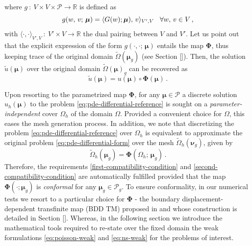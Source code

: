 \documentclass[12pt, a4paper, twoside, openright]{report}
\numberwithin{equation}{chapter}
\theoremstyle{theorem}
\theoremstyle{definition}
\theoremstyle{remark}
\theoremstyle{proposition}
\numberwithin{figure}{chapter}
\newcommand{\wt}[1]{\widetilde{#1}}
\newcommand{\bg}[1]{\boldsymbol{#1}}
\begin{document}
		where $g ~ : ~ V \times V \times \mathcal{P} \rightarrow \mathbb{R}$ is defined as
		\begin{equation*}
			g(w, \, v; \, \bg{\mu}) = \langle G(w); \bg{\mu}), \, v \rangle_{V',V} \hspace*{0.3cm} \forall w, \, v \in V \, ,
		\end{equation*}
		with $\langle \cdot, \cdot \rangle_{V',V} ~ : ~ V' \times V \rightarrow \mathbb{R}$ the dual pairing between $V$ and $V'$. Let us point out that the explicit expression of the form $g(\cdot, \cdot; \, \bg{\mu})$ entails the map $\bg{\Phi}$, thus keeping trace of the original domain $\wt{\Omega}(\bg{\mu}_g)$ (see Section \ref{}). Then, the solution $\wt{u}(\bg{\mu})$ over the original domain $\wt{\Omega}(\bg{\mu})_g$ can be recovered as
		\begin{equation}
			\wt{u}(\bg{\mu}) = u(\bg{\mu}) \circ \bg{\Phi}(\bg{\mu}) \, .
		\end{equation}
		
		Upon resorting to the parametrized map $\bg{\Phi}$, for any $\bg{\mu} \in \mathcal{P}$ a discrete solution $u_h(\bg{\mu})$ to the problem \eqref{eq:pde-differential-reference} is sought on a \emph{parameter-independent} cover $\Omega_h$ of the domain $\Omega$. Provided a convenient choice for $\Omega$, this eases the mesh generation process. In addition, we note that discretizing the problem \eqref{eq:pde-differential-reference} over $\Omega_h$ is equivalent to approximate the original problem \eqref{eq:pde-differential-form} over the mesh $\wt{\Omega}_h(\bg{\nu}_g)$, given by
		\begin{equation}
			\label{eq:parametrized-map-discrete}
			\wt{\Omega}_h(\bg{\mu}_g) = \bg{\Phi}(\Omega_h; \, \bg{\mu}_g) \, .
		\end{equation}
		Therefore, the requirements \ref{first-compatibility-condition} and \ref{second-compatibility-condition} are automatically fulfilled provided that the map $\bg{\Phi}(\cdot; \bg{\mu}_g)$ is \emph{conformal} for any $\bg{\mu}_g \in \mathcal{P}_g$. To ensure conformality, in our numerical tests we resort to a particular choice for $\bg{\Phi}$ - the boundary displacement-dependent transfinite map (BDD TM) proposed in \cite{JIR14} and whose construction is detailed in Section \ref{}. Whereas, in the following section we introduce the mathematical tools required to re-state over the fixed domain the weak formulations \eqref{eq:poisson-weak} and \eqref{eq:ns-weak} for the problems of interest.
		
	\vspace*{0.3cm}
		
\end{document}
